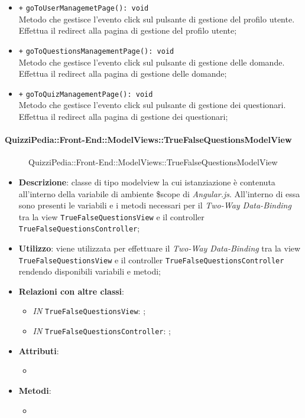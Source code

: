 \begin{itemize}
\begin{itemize}
		\item \texttt{+} \texttt{goToUserManagemetPage(): void} \\
		Metodo che gestisce l’evento click sul pulsante di gestione del profilo utente. Effettua il redirect alla pagina di gestione del profilo utente; 
		\item \texttt{+} \texttt{goToQuestionsManagementPage(): void} \\
		Metodo che gestisce l’evento click sul pulsante di gestione delle domande. Effettua il redirect alla pagina di gestione delle domande; 
		\item \texttt{+} \texttt{goToQuizManagementPage(): void} \\
		Metodo che gestisce l’evento click sul pulsante di gestione dei questionari. Effettua il redirect alla pagina di gestione dei questionari; 
	\end{itemize}
\end{itemize}

\paragraph{QuizziPedia::Front-End::ModelViews::TrueFalseQuestionsModelView}
\begin{figure} [ht]
	\centering
	\caption{QuizziPedia::Front-End::ModelViews::TrueFalseQuestionsModelView}
\end{figure} \FloatBarrier
\begin{itemize}
	\item \textbf{Descrizione}: classe di tipo modelview la cui istanziazione è contenuta all'interno della variabile di ambiente \$scope di \textit{Angular.js}. All'interno di essa sono presenti le variabili e i metodi necessari per il \textit{Two-Way Data-Binding} tra la view \texttt{TrueFalseQuestionsView} e il controller \texttt{TrueFalseQuestionsController}; 
	\item \textbf{Utilizzo}: viene utilizzata per effettuare il \textit{Two-Way Data-Binding} tra la view \texttt{TrueFalseQuestionsView} e il controller \texttt{TrueFalseQuestionsController} rendendo disponibili variabili e metodi;
	\item \textbf{Relazioni con altre classi}:
	\begin{itemize}
		\item \textit{IN} \texttt{TrueFalseQuestionsView}: ; 
		\item \textit{IN} \texttt{TrueFalseQuestionsController}: ;
	\end{itemize}
	\item \textbf{Attributi}:
	\begin{itemize}
		\item
	\end{itemize}
	\item \textbf{Metodi}:
	\begin{itemize}
		\item 
	\end{itemize}
\end{itemize}

